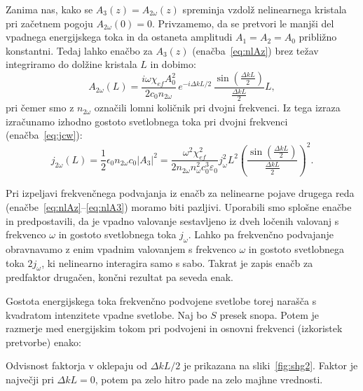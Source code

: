 Zanima nas, kako se $A_{3}(z) = A_{2\omega}(z)$ spreminja vzdolž nelinearnega kristala
pri začetnem pogoju $A_{2\omega}(0)=0$.
Privzamemo, da se pretvori le manjši del vpadnega energijskega toka in da ostaneta 
amplitudi $A_{1}=A_{2}=A_0$ približno konstantni. Tedaj lahko
enačbo za $A_{3}(z)$ (enačba~\ref{eq:nlAz}) brez težav integriramo do dolžine kristala $L$ in 
dobimo:
\begin{equation}
A_{2\omega}(L)=\frac{i\omega \chi_{ef} A_0^2}{2c_0 n_{2\omega}}
\,e^{-i\Delta kL/2}\, \frac{\sin\left(\frac{\Delta k L}{2}\right)}{\frac{\Delta kL}{2}}L,
\label{8.9}
\end{equation}
pri čemer smo z $n_{2\omega}$ označili lomni količnik pri dvojni frekvenci.
Iz tega izraza izračunamo izhodno gostoto svetlobnega toka pri dvojni
frekvenci (enačba~\ref{eq:jcw}):
\begin{equation}
j_{2\omega}(L) =\frac{1}{2}\epsilon_{0}n_{2\omega}c_0|A_3|^2 = 
\frac{\omega^2 \chi_{ef}^2}{2 n_{2\omega} n_\omega^2c_0^3\varepsilon_0} j_\omega^2 L^2
\left(\frac{\sin\left(\frac{\Delta k L}{2}\right)}{\frac{\Delta kL}{2}}\right)^2.
\label{8.10}
\end{equation}
\begin{remark}
Pri izpeljavi frekvenčnega podvajanja iz enačb za nelinearne pojave drugega
reda (enačbe~\ref{eq:nlAz}--\ref{eq:nlA3}) moramo biti pazljivi. 
Uporabili smo splošne enačbe in predpostavili, da je 
vpadno valovanje se\-stav\-lje\-no iz dveh ločenih valovanj s frekvenco $\omega$
in gostoto svetlobnega toka $j_\omega$. Lahko pa frekvenčno podvajanje obravnavamo
z enim vpadnim valovanjem s frekvenco $\omega$ in gostoto svetlobnega toka $2j_\omega$, 
ki nelinearno interagira samo s sabo. Takrat je zapis enačb za predfaktor
drugačen, končni rezultat pa seveda enak. 
\end{remark}

Gostota energijskega toka frekvenčno podvojene svetlobe torej narašča s kvadratom
intenzitete vpadne svetlobe. Naj bo $S$ presek snopa. Potem je razmerje med 
energijskim tokom pri podvojeni in osnovni frekvenci (izkoristek pretvorbe) enako:

Odvisnost faktorja v oklepaju od $\Delta kL/2$ je prikazana 
na sliki~\ref{fig:shg2}. Faktor je največji pri $\Delta kL = 0$, potem pa zelo hitro
pade na zelo majhne vrednosti. 

